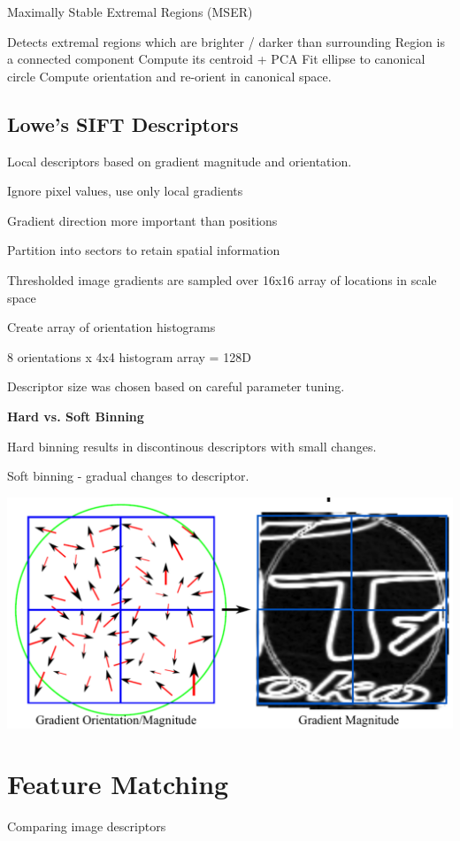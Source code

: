 Maximally Stable Extremal Regions (MSER)

Detects extremal regions which are brighter / darker than surrounding
Region is a connected component
Compute its centroid + PCA
Fit ellipse to canonical circle
Compute orientation and re-orient in canonical space.

\subsection{Lowe's SIFT Descriptors}

Local descriptors based on gradient magnitude and orientation.

Ignore pixel values, use only local gradients

Gradient direction more important than positions

Partition into sectors to retain spatial information

Thresholded image gradients are sampled over 16x16 array of locations in scale space

Create array of orientation histograms

8 orientations x 4x4 histogram array = 128D

Descriptor size was chosen based on careful parameter tuning. 


\textbf{Hard vs. Soft Binning}

Hard binning results in discontinous descriptors with small changes.

Soft binning - gradual changes to descriptor.

\includegraphics[width=0.9\columnwidth]{cv_figures/lowe.png}

\section{Feature Matching}

Comparing image descriptors

